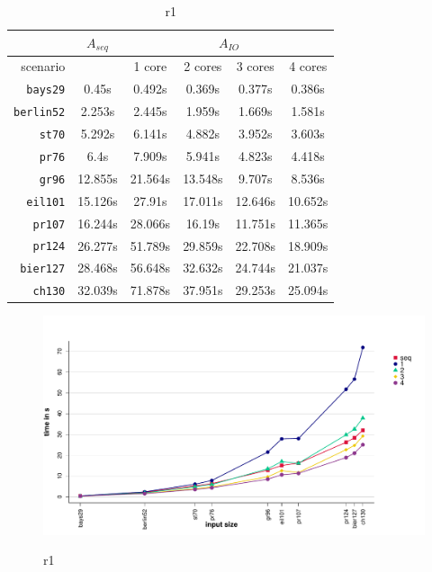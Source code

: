\begin{table}[h!]
  \centering
  \begin{tabular}{r|c||c|c|c|c|}
    \cline{2-6}
    & \multicolumn{1}{c||}{$A_{seq}$} & \multicolumn{4}{c|}{$A_{IO}$} \\
    \hline
    \multicolumn{1}{|r||}{scenario} & & 1 core & 2 cores & 3 cores & 4 cores \\
    \hline
    \hline
    \multicolumn{1}{|r||}{\texttt{bays29}} & 0.45s & 0.492s & 0.369s & 0.377s & 0.386s \\
    \hline
    \multicolumn{1}{|r||}{\texttt{berlin52}} & 2.253s & 2.445s & 1.959s & 1.669s & 1.581s \\
    \hline
    \multicolumn{1}{|r||}{\texttt{st70}} & 5.292s & 6.141s & 4.882s & 3.952s & 3.603s \\
    \hline
    \multicolumn{1}{|r||}{\texttt{pr76}} & 6.4s & 7.909s & 5.941s & 4.823s & 4.418s \\
    \hline
    \multicolumn{1}{|r||}{\texttt{gr96}} & 12.855s & 21.564s & 13.548s & 9.707s & 8.536s \\
    \hline
    \multicolumn{1}{|r||}{\texttt{eil101}} & 15.126s & 27.91s & 17.011s & 12.646s & 10.652s \\
    \hline
    \multicolumn{1}{|r||}{\texttt{pr107}} & 16.244s & 28.066s & 16.19s & 11.751s & 11.365s \\
    \hline
    \multicolumn{1}{|r||}{\texttt{pr124}} & 26.277s & 51.789s & 29.859s & 22.708s & 18.909s \\
    \hline
    \multicolumn{1}{|r||}{\texttt{bier127}} & 28.468s & 56.648s & 32.632s & 24.744s & 21.037s \\
    \hline
    \multicolumn{1}{|r||}{\texttt{ch130}} & 32.039s & 71.878s & 37.951s & 29.253s & 25.094s \\
    \hline
  \end{tabular}
  \caption{r1}
  \label{tbl:variation_ameisenanzahl}
\end{table}


\begin{figure}[h!]
  \centering
  \includegraphics[width=\textwidth]{img/test_local_1.pdf}
  \label{fig:test_local_1}
  \caption{r1}
\end{figure}


